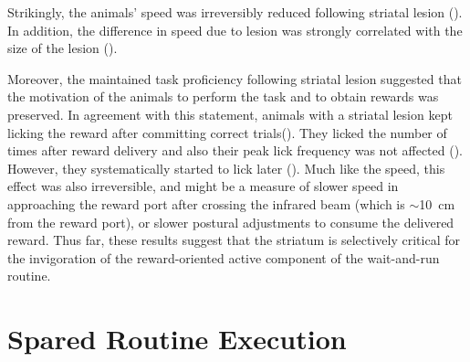 Strikingly, the animals' speed was irreversibly reduced following striatal lesion ().
In addition, the difference in speed due to lesion was strongly correlated with the size of the lesion ().

Moreover, the maintained task proficiency following striatal lesion suggested that the motivation of the animals to perform the task and to obtain rewards was preserved.
In agreement with this statement, animals with a striatal lesion kept licking the reward after committing correct trials().
They licked the number of times after reward delivery and also their peak lick frequency was not affected ().
However, they systematically started to lick later ().
Much like the speed, this effect was also irreversible, and might be a measure of slower speed in approaching the reward port after crossing the infrared beam (which is $\sim$10~cm from the reward port), or slower postural adjustments to consume the delivered reward.
Thus far, these results suggest that the striatum is selectively critical for the invigoration of the reward-oriented active component of the wait-and-run routine.


\section{Spared Routine Execution}
\label{ch:lesion:rev}

